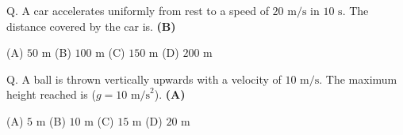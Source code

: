 \documentclass{article}
\begin{document}
\item Q. A car accelerates uniformly from rest to a speed of $20\text{ m/s}$ in $10\text{ s}$. The distance covered by the car is.
\hfill \textbf{ (B)}

(A) $50\text{ m}$ (B) $100\text{ m}$ (C) $150\text{ m}$ (D) $200\text{ m}$

\item Q. A ball is thrown vertically upwards with a velocity of $10\text{ m/s}$. The maximum height reached is ($g = 10\text{ m/s}^2$).
\hfill \textbf{ (A)}

(A) $5\text{ m}$ (B) $10\text{ m}$ (C) $15\text{ m}$ (D) $20\text{ m}$
\end{document}

